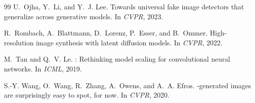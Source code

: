 \documentclass{article}
\begin{document}
\begin{thebibliography}{99}
U.~Ojha, Y.~Li, and Y.~J. Lee.
\newblock Towards universal fake image detectors that generalize
  across generative models.
\newblock In \emph{CVPR}, 2023.

R.~Rombach, A.~Blattmann, D.~Lorenz, P.~Esser, and B.~Ommer.
\newblock High-resolution image synthesis with latent diffusion
  models.
\newblock In \emph{CVPR}, 2022.

M.~Tan and Q.~V. Le.
: {R}ethinking model scaling for convolutional
  neural networks.
\newblock In \emph{ICML}, 2019.

S.-Y. Wang, O.~Wang, R.~Zhang, A.~Owens, and A.~A. Efros.
-generated images are surprisingly easy to spot, for
  now.
\newblock In \emph{CVPR}, 2020.

\end{thebibliography}
\end{document}
